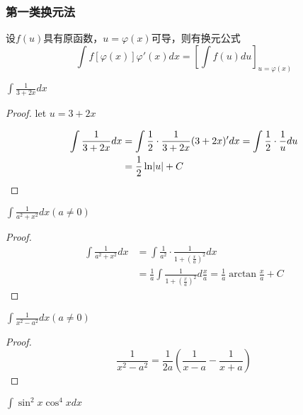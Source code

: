 \documentclass[11pt]{article}
\begin{document}
\subsubsection{第一类换元法}
\label{sec:orgb89bca7}
\begin{theorem}[]
设\(f(u)\)具有原函数，\(u=\varphi(x)\)可导，则有换元公式
\begin{equation*}
\int f[\varphi(x)]\varphi'(x)dx=\left[\int f(u)du\right]_{u=\varphi(x)}
\end{equation*}
\end{theorem}

\begin{proposition}[]
\(\int\frac{1}{3+2x}dx\)
\end{proposition}

\begin{proof}
let \(u=3+2x\)

\begin{align*}
\int\frac{1}{3+2x}dx&=\int\frac{1}{2}\cdot\frac{1}{3+2x}(3+2x)'dx=\int\frac{1}{2}\cdot\frac{1}{u}du\\
&=\frac{1}{2}\ln\abs{u}+C
\end{align*}
\end{proof}

\begin{proposition}[]
\(\int\frac{1}{a^2+x^2}dx(a\neq0)\)
\end{proposition}

\begin{proof}
\begin{align*}
\int\frac{1}{a^2+x^2}dx&=\int\frac{1}{a^2}\cdot\frac{1}{1+(\frac{x}{a})^2}dx\\
&=\frac{1}{a}\int\frac{1}{1+(\frac{x}{a})^2}d\frac{x}{a}=\frac{1}{a}\arctan\frac{x}{a}+C
\end{align*}
\end{proof}

\begin{proposition}[]
\(\int\frac{1}{x^2-a^2}dx(a\neq0)\)
\end{proposition}

\begin{proof}
\begin{equation*}
\frac{1}{x^2-a^2}=\frac{1}{2a}(\frac{1}{x-a}-\frac{1}{x+a})
\end{equation*}
\end{proof}

\begin{proposition}[]
\(\int\sin^2x\cos^4xdx\)
\end{proposition}
\end{document}
